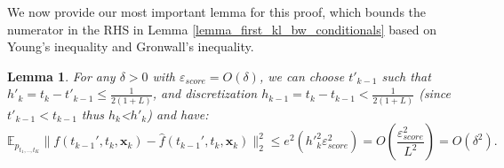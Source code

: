 \documentclass[11pt]{article}
\def\rvx{{\mathbf{x}}}
\newcommand{\E}{\mathbb{E}}
\newtheorem{lemma}{Lemma}[section]
\begin{document}
\vspace{0.2in}
\noindent
We now provide our most important lemma for this proof, which bounds the numerator in the RHS in Lemma \ref{lemma_first_kl_bw_conditionals} based on Young's inequality and Gronwall's inequality.

\begin{lemma}
\label{main_lemma_smooth}
  For any $\delta>0$ with $\varepsilon_{score} = O(\delta)$, we can choose $t'_{k-1}$ such that $h'_k=t_{k}-t'_{k-1}  \leq \frac{1}{2(1+L)}$, and discretization 
$h_{k-1} = t_{k}-t_{k-1} < \frac{1}{2(1+L)}$ (since $t'_{k-1}<t_{k-1}$ thus $h_k$<$h'_k$) and have:
\[
  \E_{{p}_{t_1,.., t_{K}}}  
  \|
  f(t_{k-1}',t_k,{\rvx}_k)-\hat{f}(t_{k-1}',t_k,{\rvx}_k)\|_2^2 \leq e^2({h'}_k^2\varepsilon^2_{score}) = {O}\left( \frac{ \varepsilon^2_{score}}{L^2}\right) = 
  {O}(\delta^2) .
\]
\end{lemma}
\end{document}
